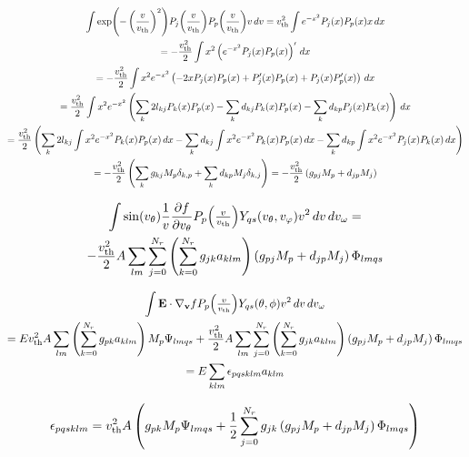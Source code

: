 \documentclass{article}
\begin{document}
\begin{multline*}
\int 
\exp\of{-\left(\frac{\vr}{\vth}\right)^2} P_j\of{\frac{\vr}{\vth}} P_p\of{\frac{\vr}{\vth}} \vr
\diff{\vr}
=
\vth^2
\int 
e^{-x^2} P_j\of{x} P_p\of{x} x
\diff{x}
\\
=
-
\frac{\vth^2}{2}
\int 
x^2
\left(
e^{-x^2} P_j\of{x} P_p\of{x}
\right)'
\diff{x}
\\
=
-
\frac{\vth^2}{2}
\int 
x^2
e^{-x^2} 
\left(
-2x
P_j\of{x} P_p\of{x}
+
P^\prime_j\of{x} P_p\of{x}
+
P_j\of{x} P^\prime_p\of{x}
\right)
\diff{x}
\\
=
\frac{\vth^2}{2}
\int 
x^2
e^{-x^2} 
\left(
\sum_{k} 2l_{kj} P_k\of{x} P_p\of{x}
-
\sum_{k} d_{kj} P_k\of{x} P_p\of{x}
-
\sum_{k} d_{kp} P_j\of{x} P_k\of{x}
\right)
\diff{x}
\\
=
\frac{\vth^2}{2}
\left(
\sum_{k} 2l_{kj} \int x^2 e^{-x^2} P_k\of{x} P_p\of{x} \diff{x}
-
\sum_{k} d_{kj} \int x^2 e^{-x^2} P_k\of{x} P_p\of{x} \diff{x}
-
\sum_{k} d_{kp} \int x^2 e^{-x^2} P_j\of{x} P_k\of{x} \diff{x}
\right)
\\
=
-
\frac{\vth^2}{2}
\left(
\sum_{k} g_{kj} M_p \delta_{k,p}
+
\sum_{k} d_{kp} M_j \delta_{k,j} 
\right)
=
-
\frac{\vth^2}{2}
\left(
g_{pj} M_p
+
d_{jp} M_j
\right)
\end{multline*}

\begin{multline*}
\myint \sin\of{\vtheta} \frac{1}{\vr} \frac{\partial f}{\partial \vtheta} P_p\of{\textstyle\frac{\vr}{\vth}} Y_{qs}\of{\vtheta,\vphi} \vr^2 \diff{\vr} \diff{\vomega}
=
\\
-
\frac{\vth^2}{2}
A \sum_{lm} \sum_{j=0}^{N_r} \left(\sum_{k=0}^{N_r} g_{jk} a_{klm} \right) 
\left(
g_{pj} M_p
+
d_{jp} M_j
\right)
\Phi_{lmqs}
\end{multline*}

\begin{multline*}
\myint \vect{E}\cdot \nabla_{\vect{v}} f P_p\of{\textstyle\frac{\vr}{\vth}} Y_{qs}\of{\theta,\phi} \vr^2 \diff{\vr} \diff{\vomega}
\\
=
E
\vth^2
A \sum_{lm} \left(\sum_{k=0}^{N_r} g_{pk} a_{klm} \right) 
M_{p}
\Psi_{lmqs}
+
\frac{\vth^2}{2}
A \sum_{lm} \sum_{j=0}^{N_r} \left(\sum_{k=0}^{N_r} g_{jk} a_{klm} \right) 
\left(
g_{pj} M_p
+
d_{jp} M_j
\right)
\Phi_{lmqs}
\\
=
E
\sum_{klm}
\epsilon_{pqsklm} a_{klm}
\end{multline*}

\begin{align*}
\epsilon_{pqsklm} =
v_\textrm{th}^2 A 
\left(
g_{pk} M_{p} \Psi_{lmqs}
+
\frac{1}{2}
\sum_{j=0}^{N_r} g_{jk} 
\left(
g_{pj} M_p
+
d_{jp} M_j
\right)
\Phi_{lmqs}
\right)
\end{align*}
\end{document}
